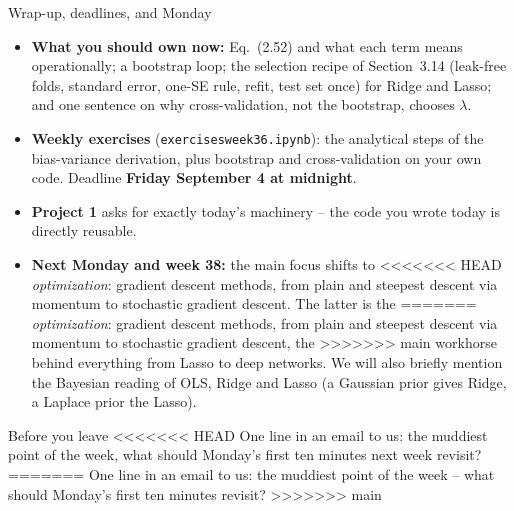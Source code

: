 \documentclass[10pt,aspectratio=169]{beamer}
\begin{document}
\begin{frame}{Wrap-up, deadlines, and Monday}
\begin{itemize}
  \item \textbf{What you should own now:} Eq.~(2.52) and what each term means
        operationally; a bootstrap loop; the selection recipe of
        Section~3.14 (leak-free folds, standard error, one-SE rule, refit,
        test set once) for Ridge and Lasso; and one sentence on why
        cross-validation, not the bootstrap, chooses $\lambda$.
  \item \textbf{Weekly exercises} (\texttt{exercisesweek36.ipynb}): the
        analytical steps of the bias-variance derivation, plus bootstrap and
        cross-validation on your own code.  Deadline \textbf{Friday
        September 4 at midnight}.
  \item \textbf{Project 1} asks for exactly today's machinery -- the code you
        wrote today is directly reusable.
  \item \textbf{Next Monday and week 38:} the main focus shifts to
<<<<<<< HEAD
                        \emph{optimization}: gradient descent methods, from plain and
                        steepest descent via momentum to stochastic gradient descent. The latter is the
=======
        \emph{optimization}: gradient descent methods, from plain and
        steepest descent via momentum to stochastic gradient descent, the
>>>>>>> main
        workhorse behind everything from Lasso to deep networks.  We will
        also briefly mention the Bayesian reading of OLS, Ridge and Lasso
        (a Gaussian prior gives Ridge, a Laplace prior the Lasso).
\end{itemize}
\begin{block}{Before you leave}
<<<<<<< HEAD
One line in an email to us: the muddiest point of
the week, what should Monday's first ten minutes next week revisit?
=======
One line in an email to us: the muddiest point of the week -- what should
Monday's first ten minutes revisit?
>>>>>>> main
\end{block}
\end{frame}
\end{document}
